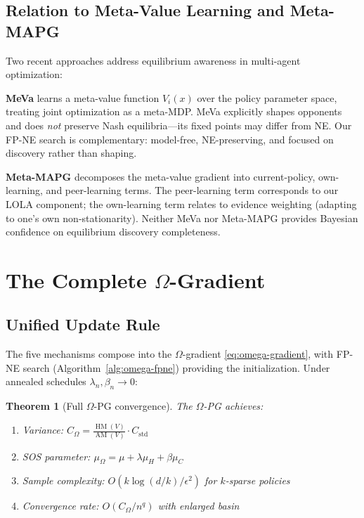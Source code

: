 \documentclass[11pt,a4paper]{article}
\newtheorem{theorem}{Theorem}[section]
\DeclareMathOperator{\AM}{AM}
\DeclareMathOperator{\HM}{HM}
\begin{document}
\subsection{Relation to Meta-Value Learning and Meta-MAPG}

Two recent approaches address equilibrium awareness in multi-agent
optimization:

\textbf{MeVa} \cite{cooijmans2023} learns a meta-value function
$V_i(x)$ over the policy parameter space, treating joint optimization
as a meta-MDP. MeVa explicitly shapes opponents and does \emph{not}
preserve Nash equilibria---its fixed points may differ from NE.
Our FP-NE search is complementary: model-free, NE-preserving, and
focused on discovery rather than shaping.

\textbf{Meta-MAPG} \cite{kim2021} decomposes the meta-value gradient into
current-policy, own-learning, and peer-learning terms. The peer-learning
term corresponds to our LOLA component; the own-learning term relates
to evidence weighting (adapting to one's own non-stationarity). Neither
MeVa nor Meta-MAPG provides Bayesian confidence on equilibrium
discovery completeness.


\section{The Complete $\Omega$-Gradient}\label{sec:omega}

\subsection{Unified Update Rule}

The five mechanisms compose into the $\Omega$-gradient
\eqref{eq:omega-gradient}, with FP-NE search (Algorithm~\ref{alg:omega-fpne})
providing the initialization. Under annealed schedules
$\lambda_n, \beta_n \to 0$:

\begin{theorem}[Full $\Omega$-PG convergence]\label{thm:full}
The $\Omega$-PG achieves:
\begin{enumerate}
    \item Variance: $C_{\Omega} = \frac{\HM(V)}{\AM(V)} \cdot C_{\text{std}}$
    \item SOS parameter: $\mu_{\Omega} = \mu + \lambda\mu_H + \beta\mu_C$
    \item Sample complexity: $O(k \log(d/k) / \epsilon^2)$ for $k$-sparse policies
    \item Convergence rate: $O(C_{\Omega} / n^q)$ with enlarged basin
\end{enumerate}
\end{theorem}
\end{document}
